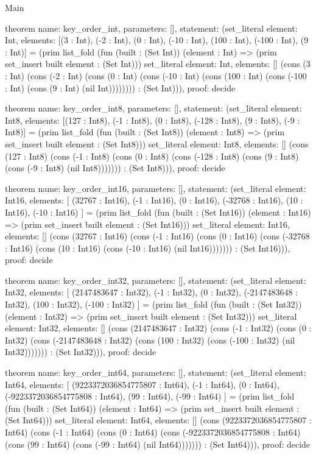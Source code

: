 \begin{lexlean}{Main}
\begin{semanticmodule}
theorem{
  name: key_order_int,
  parameters: [],
  statement: (set_literal{
    element: Int,
    elements: [(3 : Int), (-2 : Int), (0 : Int), (-10 : Int), (100 : Int), (-100 : Int), (9 : Int)]
  } = (prim list_fold (fun (built : (Set Int)) (element : Int) => (prim set_insert built element : (Set Int))) set_literal{
    element: Int,
    elements: []
  } (cons (3 : Int) (cons (-2 : Int) (cons (0 : Int) (cons (-10 : Int) (cons (100 : Int) (cons (-100 : Int) (cons (9 : Int) (nil Int)))))))) : (Set Int))),
  proof: decide{}
}

theorem{
  name: key_order_int8,
  parameters: [],
  statement: (set_literal{
    element: Int8,
    elements: [(127 : Int8), (-1 : Int8), (0 : Int8), (-128 : Int8), (9 : Int8), (-9 : Int8)]
  } = (prim list_fold (fun (built : (Set Int8)) (element : Int8) => (prim set_insert built element : (Set Int8))) set_literal{
    element: Int8,
    elements: []
  } (cons (127 : Int8) (cons (-1 : Int8) (cons (0 : Int8) (cons (-128 : Int8) (cons (9 : Int8) (cons (-9 : Int8) (nil Int8))))))) : (Set Int8))),
  proof: decide{}
}

theorem{
  name: key_order_int16,
  parameters: [],
  statement: (set_literal{
    element: Int16,
    elements: [
      (32767 : Int16),
      (-1 : Int16),
      (0 : Int16),
      (-32768 : Int16),
      (10 : Int16),
      (-10 : Int16)
    ]
  } = (prim list_fold (fun (built : (Set Int16)) (element : Int16) => (prim set_insert built element : (Set Int16))) set_literal{
    element: Int16,
    elements: []
  } (cons (32767 : Int16) (cons (-1 : Int16) (cons (0 : Int16) (cons (-32768 : Int16) (cons (10 : Int16) (cons (-10 : Int16) (nil Int16))))))) : (Set Int16))),
  proof: decide{}
}

theorem{
  name: key_order_int32,
  parameters: [],
  statement: (set_literal{
    element: Int32,
    elements: [
      (2147483647 : Int32),
      (-1 : Int32),
      (0 : Int32),
      (-2147483648 : Int32),
      (100 : Int32),
      (-100 : Int32)
    ]
  } = (prim list_fold (fun (built : (Set Int32)) (element : Int32) => (prim set_insert built element : (Set Int32))) set_literal{
    element: Int32,
    elements: []
  } (cons (2147483647 : Int32) (cons (-1 : Int32) (cons (0 : Int32) (cons (-2147483648 : Int32) (cons (100 : Int32) (cons (-100 : Int32) (nil Int32))))))) : (Set Int32))),
  proof: decide{}
}

theorem{
  name: key_order_int64,
  parameters: [],
  statement: (set_literal{
    element: Int64,
    elements: [
      (9223372036854775807 : Int64),
      (-1 : Int64),
      (0 : Int64),
      (-9223372036854775808 : Int64),
      (99 : Int64),
      (-99 : Int64)
    ]
  } = (prim list_fold (fun (built : (Set Int64)) (element : Int64) => (prim set_insert built element : (Set Int64))) set_literal{
    element: Int64,
    elements: []
  } (cons (9223372036854775807 : Int64) (cons (-1 : Int64) (cons (0 : Int64) (cons (-9223372036854775808 : Int64) (cons (99 : Int64) (cons (-99 : Int64) (nil Int64))))))) : (Set Int64))),
  proof: decide{}
}


\end{semanticmodule}
\end{lexlean}
